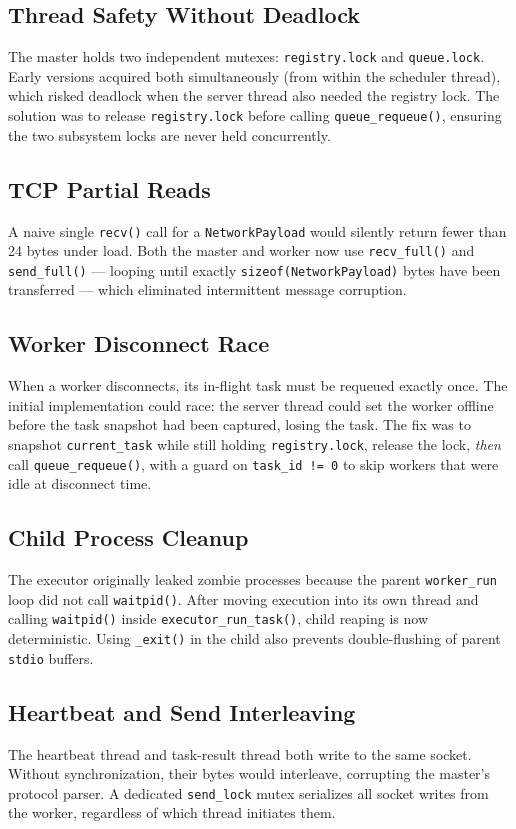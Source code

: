 \documentclass[12pt,a4paper]{article}
\begin{document}
\subsection{Thread Safety Without Deadlock}
The master holds two independent mutexes: \texttt{registry.lock} and \texttt{queue.lock}.
Early versions acquired both simultaneously (from within the scheduler thread), which
risked deadlock when the server thread also needed the registry lock.
The solution was to release \texttt{registry.lock} before calling \texttt{queue\_requeue()},
ensuring the two subsystem locks are never held concurrently.

\subsection{TCP Partial Reads}
A naive single \texttt{recv()} call for a \texttt{NetworkPayload} would silently return fewer
than 24 bytes under load. Both the master and worker now use \texttt{recv\_full()} and
\texttt{send\_full()} --- looping until exactly \texttt{sizeof(NetworkPayload)} bytes have
been transferred --- which eliminated intermittent message corruption.

\subsection{Worker Disconnect Race}
When a worker disconnects, its in-flight task must be requeued exactly once.
The initial implementation could race: the server thread could set the worker offline
before the task snapshot had been captured, losing the task. The fix was to snapshot
\texttt{current\_task} while still holding \texttt{registry.lock}, release the lock,
\emph{then} call \texttt{queue\_requeue()}, with a guard on \texttt{task\_id != 0} to
skip workers that were idle at disconnect time.

\subsection{Child Process Cleanup}
The executor originally leaked zombie processes because the parent \texttt{worker\_run}
loop did not call \texttt{waitpid()}. After moving execution into its own thread and
calling \texttt{waitpid()} inside \texttt{executor\_run\_task()}, child reaping is now
deterministic. Using \texttt{\_exit()} in the child also prevents double-flushing of
parent \texttt{stdio} buffers.

\subsection{Heartbeat and Send Interleaving}
The heartbeat thread and task-result thread both write to the same socket.
Without synchronization, their bytes would interleave, corrupting the master's protocol
parser. A dedicated \texttt{send\_lock} mutex serializes all socket writes from the worker,
regardless of which thread initiates them.
\end{document}
